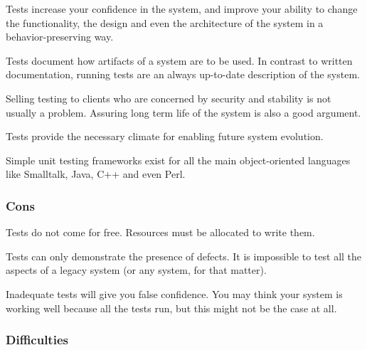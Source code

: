 \documentclass[a4paper,10pt,twoside]{book}
\begin{document}
\begin{bulletlist}
\item Tests increase your confidence in the system, and improve your ability to change the functionality, the design and even the architecture of the system in a behavior-preserving way.
\item Tests document how artifacts of a system are to be used. In contrast to written documentation, running tests are an always up-to-date description of the system.
\item Selling testing to clients who are concerned by security and stability is not usually a problem. Assuring long term life of the system is also a good argument.
\item Tests provide the necessary climate for enabling future system evolution.
\item Simple unit testing frameworks exist for all the main object-oriented languages like Smalltalk, Java, C++ and even Perl.
\end{bulletlist}

\subsubsection*{Cons}

\begin{bulletlist}
\item Tests do not come for free. Resources must be allocated to write them.
\item Tests can only demonstrate the presence of defects. It is impossible to test all the aspects of a legacy system (or any system, for that matter).
\item Inadequate tests will give you false confidence. You may think your system is working well because all the tests run, but this might not be the case at all.
\end{bulletlist}

\subsubsection*{Difficulties}
\end{document}
